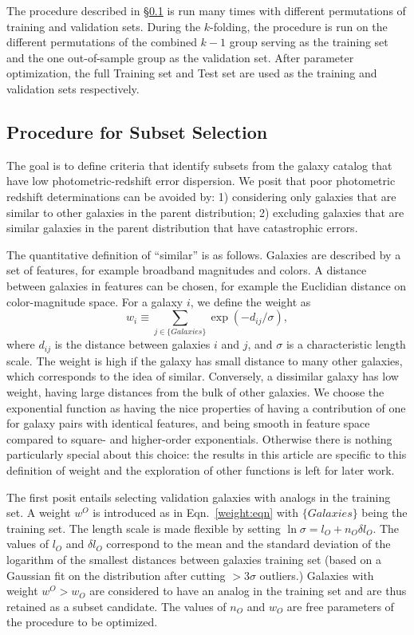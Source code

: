 \documentclass[preprint]{aastex}
\begin{document}
The procedure described in \S\ref{procedure:sec} is  run many times with different permutations
of training and validation sets.  During the $k$-folding, the procedure is run
on the different permutations of the combined $k-1$ group
serving as the training set and the one out-of-sample group as the validation set.  After parameter optimization, the
full Training set and Test set are used as the training and validation sets respectively.

\subsection{Procedure for Subset Selection}
\label{procedure:sec}
The goal is to define criteria that identify subsets from the galaxy catalog that have low photometric-redshift error dispersion.
We posit that poor photometric redshift determinations can be avoided by: 1) considering only galaxies 
that are similar to other galaxies in the parent distribution; 2) excluding galaxies that are similar galaxies in
the parent distribution that have catastrophic errors.

The quantitative definition of ``similar'' is as follows.  Galaxies are described by a set of features, for
example broadband magnitudes and colors.  A distance between galaxies in features can be chosen,
for example the Euclidian distance on color-magnitude space.  For a galaxy $i$, we define the weight  as
\begin{equation}
w_i \equiv \sum_{j \in \{Galaxies\}} \exp{\left(-d_{ij}/\sigma\right)},
\label{weight:eqn}
\end{equation}
where $d_{ij}$ is the distance between galaxies $i$ and $j$, and $\sigma$ is a characteristic
length scale.  The weight is high if the galaxy has small distance to many other galaxies, which corresponds
to the idea of  similar.  Conversely, a dissimilar galaxy has low weight, having large distances from the bulk
of other galaxies.  We choose the exponential function as having the nice properties of having a contribution of one
for galaxy pairs with identical features, and being smooth in feature space compared to square- and higher-order
exponentials.  Otherwise there is nothing particularly special about this choice: the results in this article are
specific to this definition of weight and the exploration of other functions is left for later work.

The first posit entails selecting validation galaxies with analogs in the training set.  A weight $w^O$
is introduced as in  Eqn.\ \ref{weight:eqn} with  $\{Galaxies\}$ being the training set. 
The length scale is made flexible by setting $\ln{\sigma} = l_O +
n_O\delta l_O$.  The values of $l_O$ and $\delta l_O$ correspond to the mean and the standard deviation
of the logarithm of the  smallest distances between galaxies training set (based on a Gaussian fit on the distribution
after cutting $>3\sigma$ outliers.)  Galaxies with weight $w^O>w_O$ are considered
to have an analog in the training set and are thus retained as a subset candidate.  The values of $n_O$
and $w_O$ are free parameters of
the procedure to be optimized.
\end{document}
